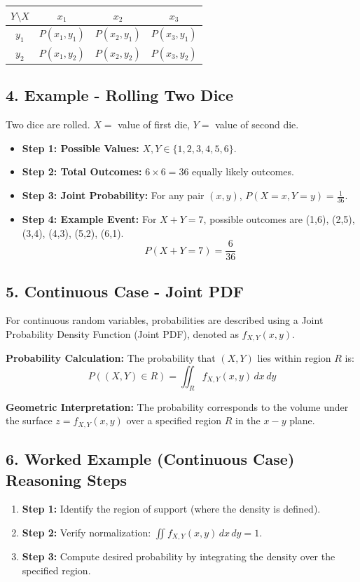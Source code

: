 \documentclass{article}
\begin{document}
\begin{center}
\begin{tabular}{cccc}
\toprule
$Y \setminus X$ & $x_1$ & $x_2$ & $x_3$ \\
\midrule
$y_1$ & $P(x_1, y_1)$ & $P(x_2, y_1)$ & $P(x_3, y_1)$ \\
$y_2$ & $P(x_1, y_2)$ & $P(x_2, y_2)$ & $P(x_3, y_2)$ \\
\bottomrule
\end{tabular}
\end{center}

\subsection*{4. Example - Rolling Two Dice}
Two dice are rolled. $X=$ value of first die, $Y=$ value of second die.
\begin{itemize}
    \item \textbf{Step 1: Possible Values:} $X, Y \in \{1, 2, 3, 4, 5, 6\}$.
    \item \textbf{Step 2: Total Outcomes:} $6 \times 6 = 36$ equally likely outcomes.
    \item \textbf{Step 3: Joint Probability:} For any pair $(x, y)$, $P(X=x, Y=y) = \frac{1}{36}$.
    \item \textbf{Step 4: Example Event:} For $X+Y=7$, possible outcomes are (1,6), (2,5), (3,4), (4,3), (5,2), (6,1).
    \[ P(X+Y=7) = \frac{6}{36} \]
\end{itemize}

\subsection*{5. Continuous Case - Joint PDF}
For continuous random variables, probabilities are described using a Joint Probability Density Function (Joint PDF), denoted as $f_{X,Y}(x,y)$.

\textbf{Probability Calculation:} The probability that $(X, Y)$ lies within region $R$ is:
\[ P((X,Y) \in R) = \iint_R f_{X,Y}(x,y) \, dx \, dy \]

\textbf{Geometric Interpretation:} The probability corresponds to the volume under the surface $z = f_{X,Y}(x,y)$ over a specified region $R$ in the $x-y$ plane.

\subsection*{6. Worked Example (Continuous Case) Reasoning Steps}
\begin{enumerate}
    \item \textbf{Step 1:} Identify the region of support (where the density is defined).
    \item \textbf{Step 2:} Verify normalization: $\iint f_{X,Y}(x,y) \, dx \, dy = 1$.
    \item \textbf{Step 3:} Compute desired probability by integrating the density over the specified region.
\end{enumerate}
\end{document}
